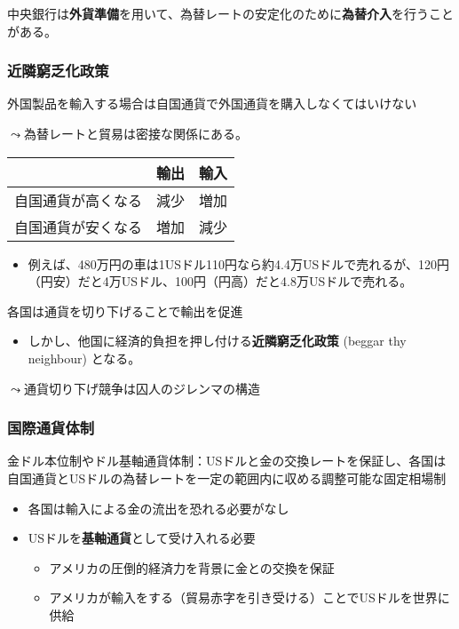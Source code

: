 \documentclass[
  xelatex,
  ja=standard]{bxjsarticle}
\providecommand{\tightlist}{%
  \setlength{\itemsep}{0pt}\setlength{\parskip}{0pt}}\usepackage{longtable,booktabs,array}
\begin{document}
中央銀行は\textbf{外貨準備}を用いて、為替レートの安定化のために\textbf{為替介入}を行うことがある。

\hypertarget{ux8fd1ux96a3ux7aaeux4e4fux5316ux653fux7b56}{%
\subsubsection{近隣窮乏化政策}\label{ux8fd1ux96a3ux7aaeux4e4fux5316ux653fux7b56}}

外国製品を輸入する場合は自国通貨で外国通貨を購入しなくてはいけない

\(\leadsto\)為替レートと貿易は密接な関係にある。

\begin{longtable}[]{@{}lcc@{}}
\toprule\noalign{}
& 輸出 & 輸入 \\
\midrule\noalign{}
\endhead
\bottomrule\noalign{}
\endlastfoot
自国通貨が高くなる & 減少 & 増加 \\
自国通貨が安くなる & 増加 & 減少 \\
\end{longtable}

\begin{itemize}
\tightlist
\item
  例えば、480万円の車は1USドル110円なら約4.4万USドルで売れるが、120円（円安）だと4万USドル、100円（円高）だと4.8万USドルで売れる。
\end{itemize}

各国は通貨を切り下げることで輸出を促進

\begin{itemize}
\tightlist
\item
  しかし、他国に経済的負担を押し付ける\textbf{近隣窮乏化政策} (beggar
  thy neighbour) となる。
\end{itemize}

\(\leadsto\)通貨切り下げ競争は囚人のジレンマの構造

\hypertarget{ux56fdux969bux901aux8ca8ux4f53ux5236}{%
\subsubsection{国際通貨体制}\label{ux56fdux969bux901aux8ca8ux4f53ux5236}}

金ドル本位制やドル基軸通貨体制：USドルと金の交換レートを保証し、各国は自国通貨とUSドルの為替レートを一定の範囲内に収める調整可能な固定相場制

\begin{itemize}
\tightlist
\item
  各国は輸入による金の流出を恐れる必要がなし
\item
  USドルを\textbf{基軸通貨}として受け入れる必要

  \begin{itemize}
  \tightlist
  \item
    アメリカの圧倒的経済力を背景に金との交換を保証
  \item
    アメリカが輸入をする（貿易赤字を引き受ける）ことでUSドルを世界に供給
  \end{itemize}
\end{itemize}
\end{document}
